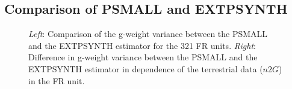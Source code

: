 \begin{figure}[H]
	\centering
	\caption{}
	\label{fig:fail}
\end{figure}





\newpage
\subsection{Comparison of PSMALL and EXTPSYNTH}
\label{sec:comp}
















\begin{figure}[H]
	\centering
	\caption{\textit{Left}: Comparison of the g-weight variance between the PSMALL and the EXTPSYNTH estimator for the 321 FR units.
		      \textit{Right}: Difference in g-weight variance between the PSMALL and the EXTPSYNTH estimator in dependence of the terrestrial data ($n2G$) in the FR unit.}
	\label{fig:compvar}
\end{figure}








